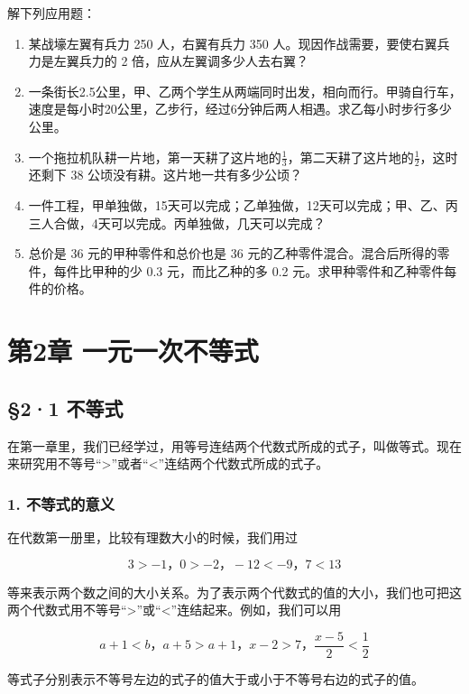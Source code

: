 解下列应用题：

\begin{enumerate}[start=8]
\item
  某战壕左翼有兵力 250 人，右翼有兵力 350
  人。现因作战需要，要使右翼兵力是左翼兵力的 2
  倍，应从左翼调多少人去右翼？
\item
  一条街长2.5公里，甲、乙两个学生从两端同时出发，相向而行。甲骑自行车，速度是每小时20公里，乙步行，经过6分钟后两人相遇。求乙每小时步行多少公里。
\item
  一个拖拉机队耕一片地，第一天耕了这片地的\(\frac{1}{3}\)，第二天耕了这片地的\(\frac{1}{2}\)，这时还剩下
  38 公顷没有耕。这片地一共有多少公顷？
\item
  一件工程，甲单独做，15天可以完成；乙单独做，12天可以完成；甲、乙、丙三人合做，4天可以完成。丙单独做，几天可以完成？
\item
  总价是 36 元的甲种零件和总价也是 36
  元的乙种零件混合。混合后所得的零件，每件比甲种的少 0.3
  元，而比乙种的多 0.2 元。求甲种零件和乙种零件每件的价格。
\end{enumerate}

\chapter{第2章 一元一次不等式}

\section{§2·1 不等式}

在第一章里，我们已经学过，用等号连结两个代数式所成的式子，叫做等式。现在来研究用不等号``\textgreater''或者``\textless''连结两个代数式所成的式子。

\subsection{1. 不等式的意义}

在代数第一册里，比较有理数大小的时候，我们用过

\[
3 > - 1\text{，} 0 > - 2\text{，} - 12 <   - 9\text{，} 7 <   13
\]

等来表示两个数之间的大小关系。为了表示两个代数式的值的大小，我们也可把这两个代数式用不等号``\textgreater''或``\textless''连结起来。例如，我们可以用

\[
a + 1 < b \text{，} a + 5 > a + 1\text{，} x - 2 > 7\text{，} \frac{x - 5}{2} <   \frac{1}{2}
\]

等式子分别表示不等号左边的式子的值大于或小于不等号右边的式子的值。

